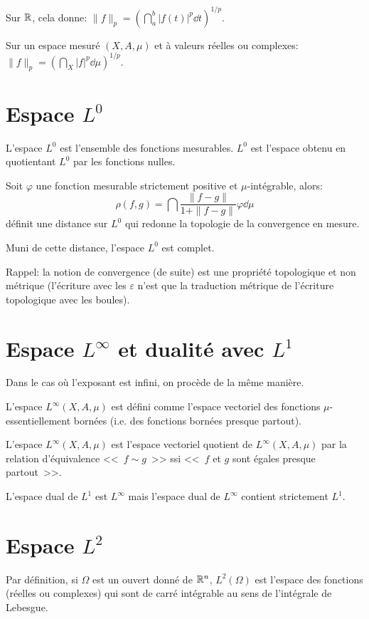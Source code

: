 Sur $\mathbb R$, cela donne: $\|f\|_p=\left(\dint_a^b |f(t)|^p\dd t\right)^{1/p}$.

Sur un espace mesuré $(X,A,\mu)$ et à valeurs réelles ou complexes: $\|f\|_p=\left(\dint_X |f|^p\dd\mu\right)^{1/p}$.

\medskip
\section{Espace $L^0$}
L'espace $L^0$ est l'ensemble des fonctions mesurables.
$L^0$ est l'espace obtenu en quotientant $L^0$ par les fonctions nulles.

\medskip
Soit $\varphi$ une fonction mesurable strictement positive et $\mu$-intégrable, alors:
\begin{equation}
\rho(f,g)=\dint \frac{\|f-g\|}{1+\|f-g\|} \varphi \dd\mu
\end{equation}
définit une distance sur $L^0$ qui redonne la topologie de la convergence en mesure.

Muni de cette distance, l'espace $L^0$ est complet.

\medskip
Rappel: la notion de convergence (de suite) est une propriété topologique et non
métrique (l'écriture avec les $\varepsilon$ n'est que la traduction métrique
de l'écriture topologique avec les boules).

\medskip
\section{Espace $L^\infty$ et dualité avec $L^1$}
Dans le cas où l'exposant est infini, on procède de la même manière.

\medskip
L'espace $L^\infty(X,A,\mu)$ est défini comme l'espace vectoriel des fonctions
$\mu$-essentiellement bornées (i.e. des fonctions bornées presque partout).

L'espace $L^\infty(X,A,\mu)$ est l'espace vectoriel quotient de $L^\infty(X,A,\mu)$
par la relation d'équivalence <<~$f \sim g$~>> ssi <<~$f$ et $g$ sont égales presque partout~>>.

\medskip
L'espace dual de $L^1$ est $L^{\infty}$ mais l'espace dual de $L^{\infty}$ contient strictement $L^1$.

\medskip
\section{Espace $L^2$}

Par définition, si $\Omega$ est un ouvert donné de $\mathbb R^n$, $L^2(\Omega)$ est l'espace des
fonctions (réelles ou complexes) qui sont  de carré intégrable au sens de l'intégrale de Lebesgue.

